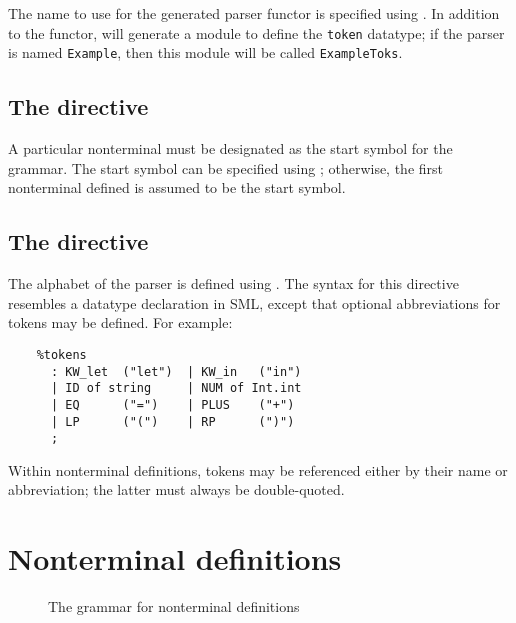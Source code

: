 The name to use for the generated parser functor is specified using .  In addition to the functor, \antlr{} will generate a module to define the {\tt token} datatype; if the parser is named {\tt Example}, then this module will be called {\tt ExampleToks}.


\subsection{The  directive}

A particular nonterminal must be designated as the start symbol for the grammar.  The start symbol can be specified using ; otherwise, the first nonterminal defined is assumed to be the start symbol.

\subsection{The  directive}

The alphabet of the parser is defined using .  The syntax for this directive resembles a datatype declaration in SML, except that optional abbreviations for tokens may be defined.  For example:
\begin{verbatim}
    %tokens
      : KW_let  ("let")  | KW_in   ("in")
      | ID of string     | NUM of Int.int
      | EQ      ("=")    | PLUS    ("+")
      | LP      ("(")    | RP      (")")
      ;
\end{verbatim}
Within nonterminal definitions, tokens may be referenced either by their name or abbreviation; the latter must always be double-quoted.

\section{Nonterminal definitions}\label{sec:antlr-nt}

\begin{figure}
\caption{The \antlr{} grammar for nonterminal definitions}\label{fig:antlr-nt-syntax}
\end{figure}

